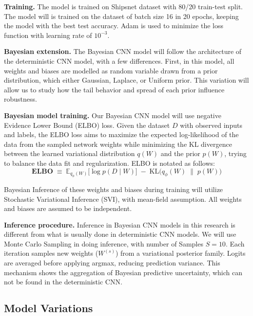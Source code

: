 \textbf{Training.} The model is trained on Shipsnet dataset with 80/20 train-test split. The model will is trained on the dataset of batch size 16 in 20 epochs, keeping the model with the best test accuracy. Adam is used to minimize the loss function with learning rate of $10^{-3}$.

\textbf{Bayesian extension.} The Bayesian CNN model will follow the architecture of the deterministic CNN model, with a few differences. First, in this model, all weights and biases are modelled as random variable drawn from a prior distribution, which either Gaussian, Laplace, or Uniform prior. This variation will allow us to study how the tail behavior and spread of each prior influence robustness.

\textbf{Bayesian model training.} Our Bayesian CNN model will use negative Evidence Lower Bound (ELBO) loss. Given the dataset $D$ with observed inputs and labels, the ELBO loss aims to maximize the expected log-likelihood of the data from the sampled network weights while minimizing the KL divergence between the learned variational distribution $q(W)$ and the prior $p(W)$, trying to balance the data fit and regularization. ELBO is notated as follows:
\begin{equation}
\textbf{ELBO} \;\equiv\; 
\mathbb{E}_{q_\phi(W)}\big[\log p(D \mid W)\big]
\;-\;
\text{KL}\big(q_\phi(W) \;\|\; p(W)\big)
\label{eq:elbo_bnn}
\end{equation}

Bayesian Inference of these weights and biases during training will utilize Stochastic Variational Inference (SVI), with mean-field assumption. All weights and biases are assumed to be independent.

\textbf{Inference procedure.} Inference in Bayesian CNN models in this research is different from what is usually done in deterministic CNN models. We will use Monte Carlo Sampling in doing inference, with number of Samples $S=10$. Each iteration samples new weights ($W^{(s)}$) from a variational posterior family. Logits are averaged before applying argmax, reducing prediction variance. This mechanism shows the aggregation of Bayesian predictive uncertainty, which can not be found in the deterministic CNN. 

\subsection{Model Variations} \label{subs:modelvar}


